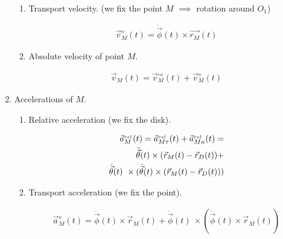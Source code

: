 \begin{enumerate}
\begin{enumerate}
              \item Transport velocity. (we fix the point $M$ $\implies$ rotation around $O_1$)
                    \begin{answer}
                        \begin{align}
                            \vec{v}^{_{tr}}_M(t) = \dot{\vec{\phi}}(t) \times \vec{r_M}(t)
                        \end{align}
                    \end{answer}
              \item Absolute velocity of point $M$.
                    \begin{answer}
                        \begin{align}
                            \vec{v}_M(t) = \vec{v}^{_{rel}}_{M}(t) + \vec{v}^{_{tr}}_M(t)
                        \end{align}
                    \end{answer}
          \end{enumerate}
    \item Accelerations of $M$.
          \begin{enumerate}
              \item Relative acceleration (we fix the disk).
                    \begin{answer}
                        \begin{align}
                            \vec{a}^{_{rel}}_{M}(t) =  \vec{a}^{_{rel}}_{M\tau}(t) + \vec{a}^{_{rel}}_{Mn}(t) = \notag \\
                            \ddot{\vec{\theta}}(t) \times (\vec{r}_{M}(t) - \vec{r}_{D}(t)) + \notag                   \\
                            \dot{\vec{\theta}}(t) \
                            \times (\dot{\vec{\theta}}(t) \times (\vec{r}_{M}(t) - \vec{r}_{D}(t)))
                        \end{align}
                    \end{answer}
              \item Transport acceleration (we fix the point).
                    \begin{answer}
                        \begin{align}
                            \vec{a}^{_{tr}}_M(t) = \ddot{\vec{\phi}}(t) \times \vec{r}_{M}(t) + \dot{\vec{\phi}}(t) \
                            \times (\dot{\vec{\phi}}(t) \times \vec{r}_{M}(t))
                        \end{align}

\end{answer}
\end{enumerate}
\end{enumerate}

